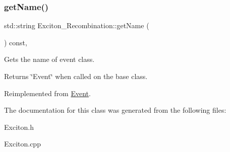 \subsubsection{\texorpdfstring{get\+Name()}{getName()}}
{\footnotesize\ttfamily std\+::string Exciton\+\_\+\+Recombination\+::get\+Name (\begin{DoxyParamCaption}{ }\end{DoxyParamCaption}) const\hspace{0.3cm}{\ttfamily [inline]}, {\ttfamily [virtual]}}



Gets the name of event class. 

\begin{DoxyReturn}{Returns}
\char`\"{}\+Event\char`\"{} when called on the base class. 
\end{DoxyReturn}


Reimplemented from \hyperlink{class_event_a8c38a406d844d05eac1ef007bad2487f}{Event}.



The documentation for this class was generated from the following files\+:\begin{DoxyCompactItemize}
\item 
Exciton.\+h\item 
Exciton.\+cpp\end{DoxyCompactItemize}
